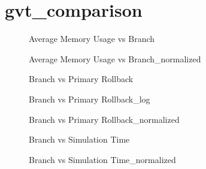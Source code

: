 \section{gvt\_comparison}
\begin{figure}[H]
\centering

\caption{Average Memory Usage vs Branch}
\end{figure}
\vspace{1cm}
\begin{figure}[H]
\centering

\caption{Average Memory Usage vs Branch\_normalized}
\end{figure}
\vspace{1cm}
\newpage
\begin{figure}[H]
\centering

\caption{Branch vs Primary Rollback}
\end{figure}
\vspace{1cm}
\begin{figure}[H]
\centering

\caption{Branch vs Primary Rollback\_log}
\end{figure}
\vspace{1cm}
\newpage
\begin{figure}[H]
\centering

\caption{Branch vs Primary Rollback\_normalized}
\end{figure}
\vspace{1cm}
\begin{figure}[H]
\centering

\caption{Branch vs Simulation Time}
\end{figure}
\vspace{1cm}
\newpage
\begin{figure}[H]
\centering

\caption{Branch vs Simulation Time\_normalized}
\end{figure}
